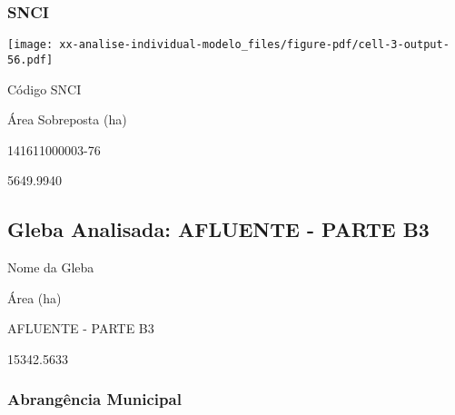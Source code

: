 \documentclass[
  11pt,
  a4paper,
  DIV=11,
  numbers=noendperiod]{scrartcl}
\begin{document}
\n    

\n  

\n

\subsubsection{SNCI}\label{snci-2}

\texttt{[image: xx-analise-individual-modelo\_files/figure-pdf/cell-3-output-56.pdf]}

\n  

\n    

\n      

Código SNCI

\n      

Área Sobreposta (ha)

\n    

\n  

\n  

\n    

\n      

141611000003-76

\n      

5649.9940

\n    

\n  

\n

\subsection{Gleba Analisada: AFLUENTE - PARTE
B3}\label{gleba-analisada-afluente---parte-b3}

\n  

\n    

\n      

Nome da Gleba

\n      

Área (ha)

\n    

\n  

\n  

\n    

\n      

AFLUENTE - PARTE B3

\n      

15342.5633

\n    

\n  

\n

\subsubsection{Abrangência Municipal}\label{abranguxeancia-municipal-3}
\end{document}
